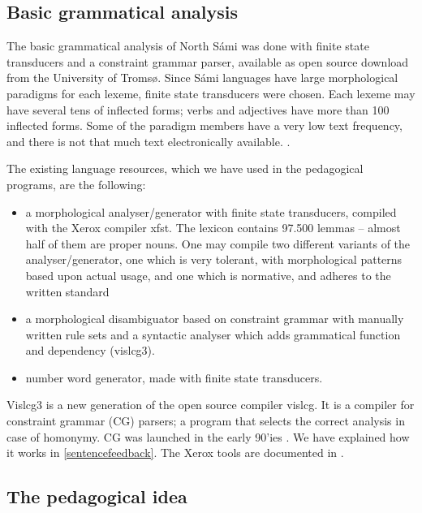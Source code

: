 \documentclass[11pt]{article}
\begin{document}
\subsection{Basic grammatical analysis}

The basic grammatical analysis of North Sámi was done with finite state transducers and a constraint grammar parser, available as open source download from the University of Tromsø. Since Sámi languages have large morphological paradigms for each lexeme, finite state transducers were chosen. Each lexeme may have several tens of inflected forms; verbs and adjectives have more than 100 inflected forms. Some of the paradigm members have a very low text frequency, and there is not that much text electronically available. \cite{Trosterud:07}.  


The existing language resources, which we have used in the pedagogical programs, are the following:

\begin{itemize}
\item a morphological analyser/generator with finite state transducers, compiled with the Xerox compiler xfst.  The lexicon contains 97.500 lemmas -- almost half of them are proper nouns. One may compile two different variants of the analyser/generator, one which is very tolerant, with morphological patterns based upon actual usage, and one which is normative, and adheres to the written standard 
\item a morphological disambiguator based on constraint grammar with manually written rule sets and a syntactic analyser which adds grammatical function and dependency (vislcg3). 
\item number word generator, made with finite state transducers.
\end{itemize}

Vislcg3 is a new generation of the open source compiler vislcg. It is a compiler for  constraint grammar (CG) parsers; a program that selects the correct analysis in case of homonymy. CG was launched in the early 90'ies \cite{Karlsson:95}. We have explained how it works in \ref{sentencefeedback}. The Xerox tools are documented in \cite{BeesleyKarttunen:03}.


\subsection{The pedagogical idea} \label{pedidea}
\end{document}
